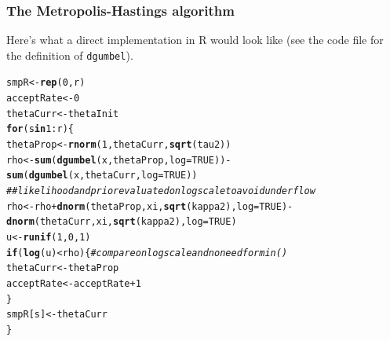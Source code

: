 \documentclass{beamer}\usepackage[]{graphicx}\usepackage[]{color}
\makeatletter
\newcommand{\hlnum}[1]{\textcolor[rgb]{0.686,0.059,0.569}{#1}}%
\newcommand{\hlcom}[1]{\textcolor[rgb]{0.678,0.584,0.686}{\textit{#1}}}%
\newcommand{\hlopt}[1]{\textcolor[rgb]{0,0,0}{#1}}%
\newcommand{\hlstd}[1]{\textcolor[rgb]{0.345,0.345,0.345}{#1}}%
\newcommand{\hlkwa}[1]{\textcolor[rgb]{0.161,0.373,0.58}{\textbf{#1}}}%
\newcommand{\hlkwb}[1]{\textcolor[rgb]{0.69,0.353,0.396}{#1}}%
\newcommand{\hlkwc}[1]{\textcolor[rgb]{0.333,0.667,0.333}{#1}}%
\newcommand{\hlkwd}[1]{\textcolor[rgb]{0.737,0.353,0.396}{\textbf{#1}}}%
\newenvironment{kframe}{%
 \def\at@end@of@kframe{}%
 \ifinner\ifhmode%
  \def\at@end@of@kframe{\end{minipage}}%
  \begin{minipage}{\columnwidth}%
 \fi\fi%
 \def\FrameCommand##1{\hskip\@totalleftmargin \hskip-\fboxsep
 \colorbox{shadecolor}{##1}\hskip-\fboxsep
     \hskip-\linewidth \hskip-\@totalleftmargin \hskip\columnwidth}%
 \MakeFramed {\advance\hsize-\width
   \@totalleftmargin\z@ \linewidth\hsize
   \@setminipage}}%
 {\par\unskip\endMakeFramed%
 \at@end@of@kframe}
\newenvironment{knitrout}{}{} %
\makeatother
\begin{document}
\begin{frame}[fragile] 
\sffamily
\frametitle{The Metropolis-Hastings algorithm}

Here's what a direct implementation in R would look like (see the code file for the definition of \texttt{dgumbel}).

\begin{knitrout}\scriptsize
{}\color{fgcolor}\begin{kframe}
\begin{alltt}
\hlstd{smpR} \hlkwb{<-} \hlkwd{rep}\hlstd{(}\hlnum{0}\hlstd{, r)}
\hlstd{acceptRate} \hlkwb{<-} \hlnum{0}
\hlstd{thetaCurr} \hlkwb{<-} \hlstd{thetaInit}
\hlkwa{for}\hlstd{(s} \hlkwa{in} \hlnum{1}\hlopt{:}\hlstd{r)\{}
    \hlstd{thetaProp} \hlkwb{<-} \hlkwd{rnorm}\hlstd{(}\hlnum{1}\hlstd{, thetaCurr,} \hlkwd{sqrt}\hlstd{(tau2))}
    \hlstd{rho} \hlkwb{<-} \hlkwd{sum}\hlstd{(}\hlkwd{dgumbel}\hlstd{(x, thetaProp,} \hlkwc{log} \hlstd{=} \hlnum{TRUE}\hlstd{))} \hlopt{-}
        \hlkwd{sum}\hlstd{(}\hlkwd{dgumbel}\hlstd{(x, thetaCurr,} \hlkwc{log} \hlstd{=} \hlnum{TRUE}\hlstd{))}
    \hlcom{## likelihood and prior evaluated on log scale to avoid underflow}
    \hlstd{rho} \hlkwb{<-} \hlstd{rho} \hlopt{+} \hlkwd{dnorm}\hlstd{(thetaProp, xi,} \hlkwd{sqrt}\hlstd{(kappa2),} \hlkwc{log} \hlstd{=} \hlnum{TRUE}\hlstd{)} \hlopt{-}
        \hlkwd{dnorm}\hlstd{(thetaCurr, xi,} \hlkwd{sqrt}\hlstd{(kappa2),} \hlkwc{log} \hlstd{=} \hlnum{TRUE}\hlstd{)}
    \hlstd{u} \hlkwb{<-} \hlkwd{runif}\hlstd{(}\hlnum{1}\hlstd{,} \hlnum{0}\hlstd{,} \hlnum{1}\hlstd{)}
    \hlkwa{if}\hlstd{(}\hlkwd{log}\hlstd{(u)} \hlopt{<} \hlstd{rho)\{}  \hlcom{# compare on log scale and no need for min()}
      \hlstd{thetaCurr} \hlkwb{<-} \hlstd{thetaProp}
      \hlstd{acceptRate} \hlkwb{<-} \hlstd{acceptRate} \hlopt{+} \hlnum{1}
    \hlstd{\}}
    \hlstd{smpR[s]} \hlkwb{<-} \hlstd{thetaCurr}
\hlstd{\}}
\end{alltt}
\end{kframe}
\end{knitrout}

\end{frame}
\end{document}
